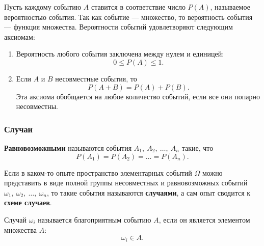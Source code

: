 \documentclass[a4paper]{article}
\newcommand{\key}[1]{{\color{Medium}\bfseries #1}}
\begin{document}
                Пусть каждому событию $A$ ставится в соответствие число $P(A)$, называемое вероятностью события. Так как событие --- множество, то вероятность события --- функция множества. Вероятности событий удовлетворяют следующим аксиомам:
                \begin{enumerate}
                    \item Вероятность любого события заключена между нулем и единицей:
                    \begin{equation*}
                        0 \leqslant P(A) \leqslant 1 .
                    \end{equation*}
                        
                    \item Если $A$ и $B$ несовместные события, то
                    \begin{equation*}
                        P(A + B) = P(A) + P(B) .
                    \end{equation*}
                    Эта аксиома обобщается на любое количество событий, если все они попарно несовместны.
                \end{enumerate}

            \subsubsection{Случаи}

                \key{Равновозможными} называются события $A_1 , \: A_2 , \: \ldots , \: A_n$ такие, что
                \begin{equation*}
                    P(A_1) = P(A_2) = \ldots = P(A_n) .
                \end{equation*}
                
                Если в каком-то опыте пространство элементарных событий $\Omega$ можно представить в виде полной группы несовместных и равновозможных событий $\omega_1 , \: \omega_2 , \: \ldots , \: \omega_n$, то такие события называются \key{случаями}, а сам опыт сводится к \key{схеме случаев}.

                Случай $\omega_i$ называется благоприятным событию $A$, если он является элементом множества $A$:
                \begin{equation*}
                    \omega_i \in A .
                \end{equation*}
\end{document}
